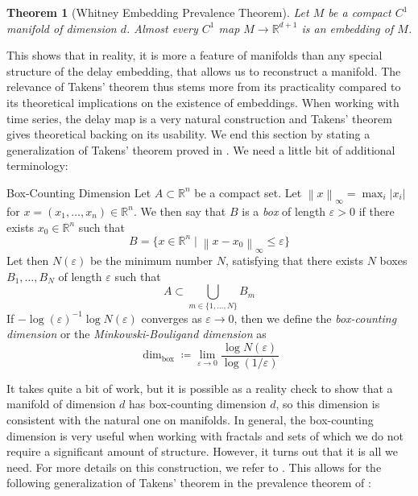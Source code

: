 \documentclass[11pt, a4paper]{memoir}
\theoremstyle{break}
\newtheorem{thm}{Theorem}
\theoremstyle{break}
\theoremstyle{nonumberplain}
\newcommand{\mR}{\mathbb{R}}
\newcommand{\norm}[1]{\left\lVert#1\right\rVert}
\begin{document}
\begin{thm}[Whitney Embedding Prevalence Theorem]
Let $M$ be a compact $C^1$ manifold of dimension $d$. Almost every $C^1$ map $M\to \mR^{d+1}$ is an embedding of $M$.
\end{thm}
This shows that in reality, it is more a feature of manifolds than any special structure of the delay embedding, that allows us to reconstruct a manifold. The relevance of Takens' theorem thus stems more from its practicality compared to its  theoretical implications on the existence of embeddings. When working with time series, the delay map is a very natural construction and Takens' theorem gives theoretical backing on its usability. We end this section by stating a generalization of Takens' theorem proved in \cite{Sauer1991}. We need a little bit of additional terminology:
\begin{mydefinition}{Box-Counting Dimension}
Let $A\subset \mR^n$ be a compact set. Let $\norm{x}_{\infty}=\max_ i |x_i|$ for $x=(x_1,\ldots,x_n)\in \mR^n$. We then say that $B$ is a \emph{box} of length $\varepsilon>0$ if there exists $x_0\in \mR^n$ such that $$B=\{x\in \mR^n\mid \norm{x-x_0}_{\infty}\leqslant \varepsilon \}$$
Let then $N(\varepsilon)$ be the minimum number $N$, satisfying that there exists $N$ boxes $B_1,\ldots,B_N$ of length $\varepsilon$ such that
$$A\subset \bigcup_{m\in\{1,\ldots,N\}} B_m$$
If $-\log(\varepsilon)^{-1}\log N(\varepsilon)$
converges as $\varepsilon \to 0$, then we define the \emph{box-counting dimension} or the \emph{Minkowski-Bouligand dimension} as
$$\dim_{\text{box}}\coloneqq \lim_{\varepsilon\to 0}\frac{\log N(\varepsilon)}{\log(1/\varepsilon)}$$
\end{mydefinition}
It takes quite a bit of work, but it is possible as a reality check to show that a manifold of dimension $d$ has box-counting dimension $d$, so this dimension is consistent with the natural one on manifolds. In general, the box-counting dimension is very useful when working with fractals and sets of which we do not require a significant amount of structure. However, it turns out that it is all we need. For more details on this construction, we refer to \cite{Fractals}. This allows for the following generalization of Takens' theorem in the prevalence theorem of \cite{Sauer1991}:
\end{document}
